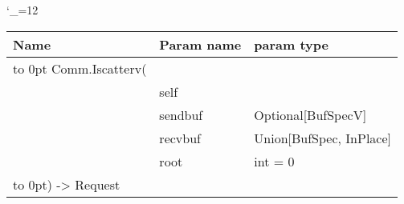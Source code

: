 \begingroup \catcode`\_=12 \tt
\begin{tabular}{lll}
\toprule
\textrm{Name}&\textrm{Param name}&\textrm{param type}\\
\midrule
\hbox to 0pt {Comm.Iscatterv(\hss}\\
& self\\
& sendbuf & Optional[BufSpecV]\\
& recvbuf & Union[BufSpec, InPlace]\\
& root & int = 0\\
\hbox to 0pt{) -> Request\hss}\\
\bottomrule
\end{tabular}
\endgroup
